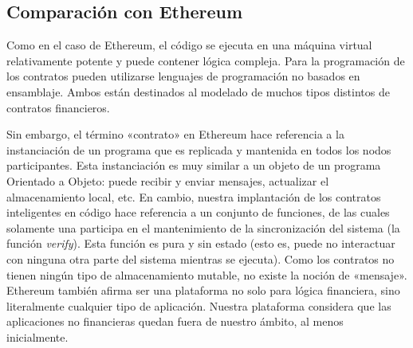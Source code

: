 \documentclass{article}
\begin{document}
\subsection{Comparación con Ethereum}
Como en el caso de Ethereum, el código se ejecuta en una máquina virtual relativamente potente y puede contener lógica compleja. Para la programación de los contratos pueden utilizarse lenguajes de programación no basados en ensamblaje.  Ambos están destinados al modelado de muchos tipos distintos de contratos financieros.

Sin embargo, el término «contrato» en Ethereum hace referencia a la instanciación de un programa que es replicada y mantenida en todos los nodos participantes. Esta instanciación es muy similar a un objeto de un programa Orientado a Objeto: puede recibir y enviar mensajes, actualizar el almacenamiento local, etc. En cambio, nuestra implantación de los contratos inteligentes en código hace referencia a un conjunto de funciones, de las cuales solamente una participa en el mantenimiento de la sincronización del sistema (la función \textit{verify}). Esta función es pura y sin estado (esto es, puede no interactuar con ninguna otra parte del sistema mientras se ejecuta).	Como los contratos no tienen ningún tipo de almacenamiento mutable, no existe la noción de «mensaje». Ethereum también afirma ser una plataforma no solo para lógica financiera, sino literalmente cualquier tipo de aplicación. Nuestra plataforma considera que las aplicaciones no financieras quedan fuera de nuestro ámbito, al menos inicialmente.


\end{document}
